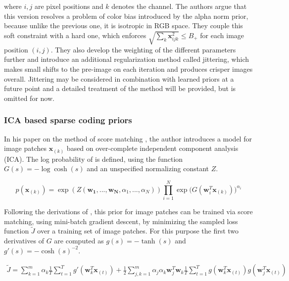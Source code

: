 \documentclass{article}
\begin{document}
where $i,j$ are pixel positions and $k$ denotes the channel. The authors argue that this version resolves a problem of color bias introduced by the alpha norm prior, because unlike the previous one, it is isotropic in RGB space. They couple this soft constraint with a hard one, which enforces $\sqrt{\sum_k \mathbf{x}_{ijk}^2} \leq B_{+}$ for each image position $(i,j)$. They also develop the weighting of the different parameters further and introduce an additional regularization method called jittering, which makes small shifts to the pre-image on each iteration and produces crisper images overall. Jittering may be considered in combination with learned priors at a future point and a detailed treatment of the method will be provided, but is omitted for now.

\subsubsection{ICA based sparse coding priors}

In his paper on the method of score matching \cite{hyvarinen2003}, the author introduces a model for image patches $\mathbf{x}_{(k)}$ based on over-complete independent component analysis (ICA). The log probability of is defined, using the function $G(s) = - \log \cosh(s)$ and an unspecified normalizing constant $Z$. 

\begin{equation}
	p(\mathbf{x}_{(k)}) = \exp (Z(\mathbf{w_1},...,\mathbf{w_N}, \alpha_1, ... , \alpha_N)) \prod_{i=1}^{N} \exp \big(G(\mathbf{w}_i^T \mathbf{x}_{(k)}) \big)^{\alpha_i}  
	\label{eq:ica_patch}
\end{equation}

Following the derivations of \cite{hyvarinen2003}, this prior for image patches can be trained via score matching, using mini-batch gradient descent, by minimizing the sampled loss function $\tilde{J}$ over a training set of image patches. For this purpose the first two derivatives of $G$ are computed as $g(s) = - \tanh(s)$ and $g'(s) = - \cosh(s)^{-2}$.

\begin{equation}
\begin{aligned}
\tilde{J} = \sum_{k=1}^{m} \alpha_k \frac{1}{T} \sum_{t=1}^{T} g'(\mathbf{w}_k^T \mathbf{x}_{(t)}) + \frac{1}{2} \sum_{j,k = 1}^{m} \alpha_j \alpha_k \mathbf{w}_j^T \mathbf{w}_k \frac{1}{T} \sum_{t=1}^{T} g(\mathbf{w}_k^T \mathbf{x}_{(t)}) g(\mathbf{w}_j^T \mathbf{x}_{(t)})
\end{aligned}
\label{eq:jtilde}
\end{equation}
\end{document}
